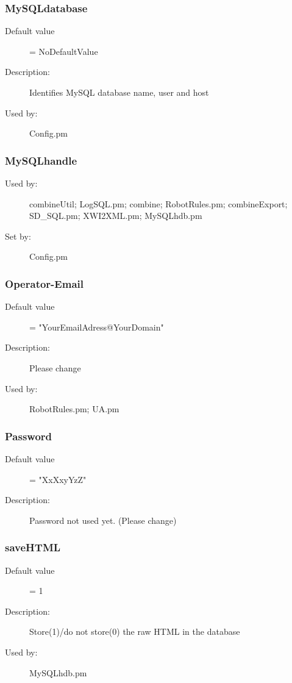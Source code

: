 \subsubsection{MySQLdatabase}
\label{MySQLdatabase}
\begin{description}
\item[Default value] = NoDefaultValue
\item[Description:] Identifies MySQL database name, user and host
\item[Used by:] Config.pm
\end{description}
\subsubsection{MySQLhandle}
\label{MySQLhandle}
\begin{description}
\item[Used by:] combineUtil; LogSQL.pm; combine; RobotRules.pm; combineExport; SD\_SQL.pm; XWI2XML.pm; MySQLhdb.pm
\item[Set by:] Config.pm
\end{description}
\subsubsection{Operator-Email}
\label{Operator-Email}
\begin{description}
\item[Default value] = "YourEmailAdress@YourDomain"
\item[Description:] Please change
\item[Used by:] RobotRules.pm; UA.pm
\end{description}
\subsubsection{Password}
\label{Password}
\begin{description}
\item[Default value] = "XxXxyYzZ"
\item[Description:] Password not used yet. (Please change)
\end{description}
\subsubsection{saveHTML}
\label{saveHTML}
\begin{description}
\item[Default value] = 1
\item[Description:] Store(1)/do not store(0) the raw HTML in the database
\item[Used by:] MySQLhdb.pm
\end{description}
